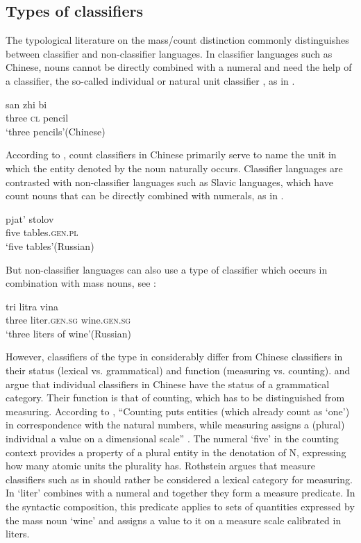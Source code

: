 \documentclass[output=paper,
colorlinks,
citecolor=brown,
newtxmath
]{langscibook}
\begin{document}
\subsection{Types of classifiers}

The typological literature on the mass/count distinction commonly distinguishes between classifier and non-classifier languages. In classifier languages such as Chinese, nouns cannot be directly combined with a numeral and need the help of a classifier, the so-called individual or natural unit classifier \citep{Krifka1989, Krifka1995}, as in .

\ea \label{ex:13}
\gll san zhi bi \\
    three \textsc{cl} pencil\\
\glt `three pencils'\hfill (Chinese)
\z

\noindent According to \cite{Cheng.Sybesma1999}, count classifiers in Chinese primarily serve to name the unit in which the entity denoted by the noun naturally occurs. Classifier languages are contrasted with non-classifier languages such as Slavic languages, which have count nouns that can be directly combined with numerals, as in .

\ea \label{ex:14}
\gll pjat' stolov \\
    five tables.\textsc{gen.pl}\\
\glt `five tables'\hfill (Russian)
\z

\noindent But non-classifier languages can also use a type of classifier which occurs in combination with mass nouns, see :

\ea \label{ex:15}
\gll tri 	litra 	vina \\
    three	liter.\textsc{gen.sg}	wine.\textsc{gen.sg}\\
\glt `three liters of wine'\hfill (Russian)
\z

\noindent However, classifiers of the type in  considerably differ from Chinese classifiers in their status (lexical vs. grammatical) and function (measuring vs. counting). \cite{Cheng.Sybesma1999} and \cite{Li2013} argue that individual classifiers in Chinese have the status of a grammatical category. Their function is that of counting, which has to be distinguished from measuring. According to \cite{Rothstein2010}, ``Counting puts entities (which already count as `one') in correspondence with the natural numbers, while measuring assigns a (plural) individual a value on a dimensional scale'' \citep[386]{Rothstein2010}. The numeral `five' in the counting context  provides a property of a plural entity in the denotation of N, expressing how many atomic units the plurality has. Rothstein argues that measure classifiers such as in  should rather be considered a lexical category for measuring. In  `liter' combines with a numeral and together they form a measure predicate. In the syntactic composition, this predicate applies to sets of quantities expressed by the mass noun `wine' and assigns a value to it on a measure scale calibrated in liters.
\end{document}
